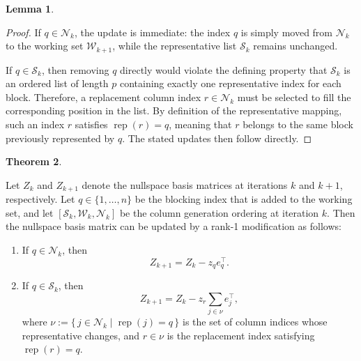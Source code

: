 \documentclass{book}
\theoremstyle{definition}
\newtheorem{theorem}{Theorem}[section]
\newtheorem{lemma}[theorem]{Lemma}
\numberwithin{algorithm_}{chapter}
\begin{document}
{\begin{lemma}
\begin{proof}
If \(q \in \mathcal{N}_k\), the update is immediate: the index \(q\) is simply moved from \(\mathcal{N}_k\) to the working set \(\mathcal{W}_{k+1}\), while the representative list \(\mathcal{S}_k\) remains unchanged.

\medskip

If \(q \in \mathcal{S}_k\), then removing \(q\) directly would violate the defining property that \(\mathcal{S}_k\) is an ordered list of length \(p\) containing exactly one representative index for each block. Therefore, a replacement column index \(r \in \mathcal{N}_k\) must be selected to fill the corresponding position in the list. By definition of the representative mapping, such an index \(r\) satisfies \(\operatorname{rep}(r) = q\), meaning that \(r\) belongs to the same block previously represented by \(q\). The stated updates then follow directly.

\end{proof}
\end{lemma}


\begin{theorem}
\label{thm:update-nullspace}

Let \(Z_k\) and \(Z_{k+1}\) denote the nullspace basis matrices at iterations \(k\) and \(k+1\), respectively.  
Let \(q \in \{1, \ldots, n\}\) be the blocking index that is added to the working set, and let 
\([\mathcal{S}_k, \mathcal{W}_k, \mathcal{N}_k]\) be the column generation ordering at iteration \(k\).
Then the nullspace basis matrix can be updated by a rank-1 modification as follows:

\begin{enumerate}
    \item If \(q \in \mathcal{N}_k\), then
    \begin{equation}
    Z_{k+1}
    =
    Z_k - z_q e_q^\top.
    \end{equation}

    \item If \(q \in \mathcal{S}_k\), then
    \begin{equation}
    Z_{k+1}
    =
    Z_k
    -
    z_r
    \sum_{j \in \nu} e_j^\top,
    \end{equation}
    where  $\nu := \{\, j \in \mathcal{N}_k \mid \operatorname{rep}(j) = q \,\}$
    is the set of column indices whose representative changes, and
    \(r \in \nu\) is the replacement index satisfying
    \(\operatorname{rep}(r) = q\).
\end{enumerate}



\end{theorem}}
\end{document}
